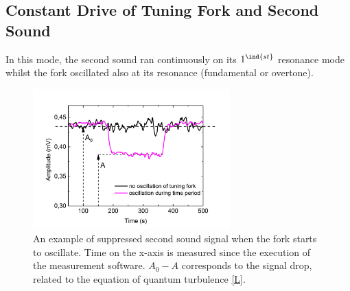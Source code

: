 \subsection*{Constant Drive of Tuning Fork and Second Sound}

In this mode, the second sound ran continuously on its $ 1^{\ind{st}} $ resonance mode whilst the fork oscillated also at its resonance (fundamental or overtone).

\begin{figure}[h]
	\centering
	\vspace{-0.5cm}
	\includegraphics[width=0.68\textwidth]{graphs/example}
	\caption{An example of suppressed second sound signal when the fork starts to oscillate. Time on the x-axis is measured since the execution of the measurement software. $ A_0-A$ corresponds to the signal drop, related to the equation of quantum turbulence \ref{L}.}
\end{figure}